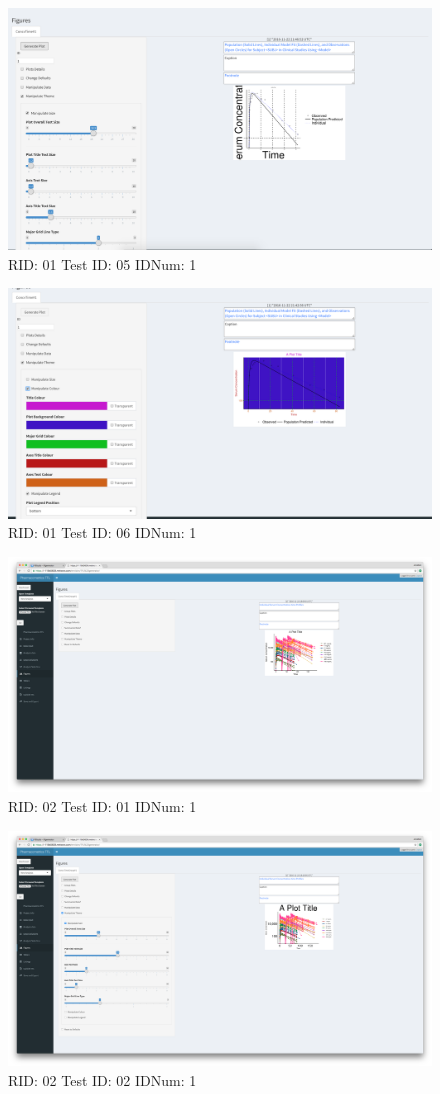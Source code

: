 \begin{figure}[H]
\includegraphics[width=.8\textwidth]{screencaps/01-05-1.png}
\caption{RID: 01 Test ID: 05 IDNum: 1}
\end{figure}
\begin{figure}[H]
\includegraphics[width=.8\textwidth]{screencaps/01-06-1.png}
\caption{RID: 01 Test ID: 06 IDNum: 1}
\end{figure}
\begin{figure}[H]
\includegraphics[width=.8\textwidth]{screencaps/02-01-1.png}
\caption{RID: 02 Test ID: 01 IDNum: 1}
\end{figure}
\begin{figure}[H]
\includegraphics[width=.8\textwidth]{screencaps/02-02-1.png}
\caption{RID: 02 Test ID: 02 IDNum: 1}
\end{figure}
